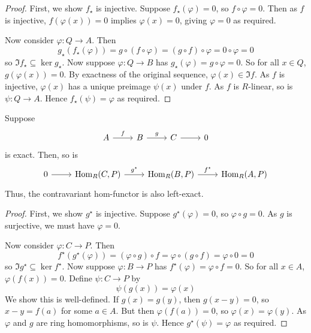 \begin{proof}
    First, we show \( f_\star \) is injective.
    Suppose \( f_\star(\varphi) = 0 \), so \( f \circ \varphi = 0 \).
    Then as \( f \) is injective, \( f(\varphi(x)) = 0 \) implies \( \varphi(x) = 0 \), giving \( \varphi = 0 \) as required.

    Now consider \( \varphi : Q \to A \).
    Then
    \[ g_\star (f_\star(\varphi)) = g \circ (f \circ \varphi) = (g \circ f) \circ \varphi = 0 \circ \varphi = 0 \]
    so \( \Im f_\star \subseteq \ker g_\star \).
    Now suppose \( \varphi : Q \to B \) has \( g_\star(\varphi) = g \circ \varphi = 0 \).
    So for all \( x \in Q \), \( g(\varphi(x)) = 0 \).
    By exactness of the original sequence, \( \varphi(x) \in \Im f \).
    As \( f \) is injective, \( \varphi(x) \) has a unique preimage \( \psi(x) \) under \( f \).
    As \( f \) is \( R \)-linear, so is \( \psi : Q \to A \).
    Hence \( f_\star(\psi) = \varphi \) as required.
\end{proof}
\begin{proposition}
    Suppose
    \[\begin{tikzcd}
        A & B & C & 0
        \arrow["f", from=1-1, to=1-2]
        \arrow["g", from=1-2, to=1-3]
        \arrow[from=1-3, to=1-4]
    \end{tikzcd}\]
    is exact.
    Then, so is
    \[\begin{tikzcd}
        0 & {\Hom_R(C, P)} & {\Hom_R(B, P)} & {\Hom_R(A, P)}
        \arrow[from=1-1, to=1-2]
        \arrow["{g^\star}", from=1-2, to=1-3]
        \arrow["{f^\star}", from=1-3, to=1-4]
    \end{tikzcd}\]
    Thus, the contravariant hom-functor is also left-exact.
\end{proposition}
\begin{proof}
    First, we show \( g^\star \) is injective.
    Suppose \( g^\star(\varphi) = 0 \), so \( \varphi \circ g = 0 \).
    As \( g \) is surjective, we must have \( \varphi = 0 \).

    Now consider \( \varphi : C \to P \).
    Then
    \[ f^\star(g^\star(\varphi)) = (\varphi \circ g) \circ f = \varphi \circ (g \circ f) = \varphi \circ 0 = 0 \]
    so \( \Im g^\star \subseteq \ker f^\star \).
    Now suppose \( \varphi : B \to P \) has \( f^\star(\varphi) = \varphi \circ f = 0 \).
    So for all \( x \in A \), \( \varphi(f(x)) = 0 \).
    Define \( \psi : C \to P \) by
    \[ \psi(g(x)) = \varphi(x) \]
    We show this is well-defined.
    If \( g(x) = g(y) \), then \( g(x - y) = 0 \), so \( x - y = f(a) \) for some \( a \in A \).
    But then \( \varphi(f(a)) = 0 \), so \( \varphi(x) = \varphi(y) \).
    As \( \varphi \) and \( g \) are ring homomorphisms, so is \( \psi \).
    Hence \( g^\star(\psi) = \varphi \) as required.
\end{proof}
